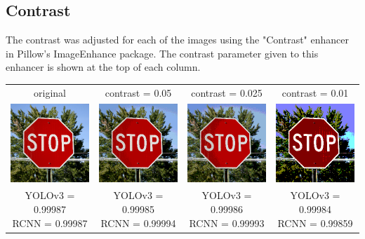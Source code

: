 \documentclass{article}
\begin{document}
\subsection{Contrast}
The contrast was adjusted for each of the images using the "Contrast" enhancer in Pillow's ImageEnhance package. The contrast parameter given to this enhancer is shown at the top of each column.
\begin{center}
\begin{tabular}{ c c c c }
    original & contrast = 0.05 & contrast = 0.025 & contrast = 0.01 \\
    \includegraphics[width=0.2\linewidth]{../test_images/stop.png} & \includegraphics[width=0.2\linewidth]{../test_images/perturbed/stop_contrast_0_050.png} & \includegraphics[width=0.2\linewidth]{../test_images/perturbed/stop_contrast_0_025.png} & \includegraphics[width=0.2\linewidth]{../test_images/perturbed/stop_contrast_0_010.png} \\
    \makecell{YOLOv3 = 0.99987 \\ RCNN = 0.99987} & \makecell{YOLOv3 = 0.99985 \\ RCNN = 0.99994} & \makecell{YOLOv3 = 0.99986 \\ RCNN = 0.99993} & \makecell{YOLOv3 = 0.99984 \\ RCNN = 0.99859} \\[1cm]

\end{tabular}
\end{center}
\end{document}
